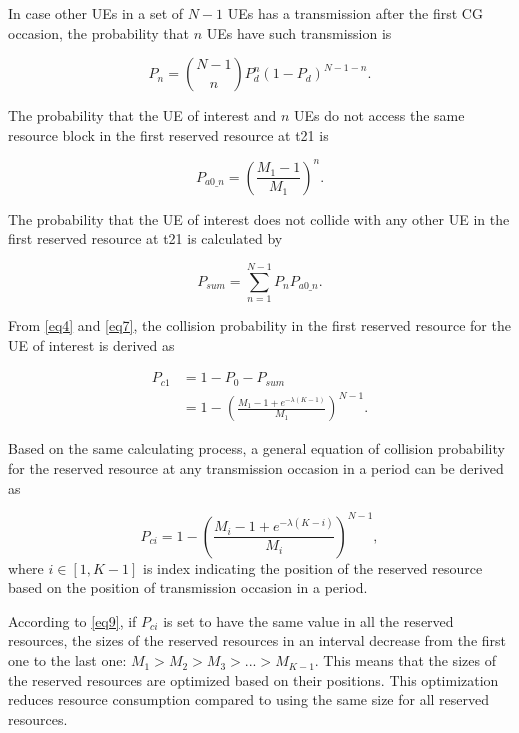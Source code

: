\documentclass{ieeeaccess}
\begin{document}
In case other UEs in a set of $N-1$ UEs has a transmission after the first CG occasion, the probability that $n$  UEs have such transmission is 

\begin{equation}
P_{n} = \binom {N-1}{n}P_{d}^{n}(1-P_{d})^{N-1-n}.\label{eq5}
\end{equation}

The probability that the UE of interest and $n$ UEs do not access the same resource block in the first reserved resource at t21 is 

\begin{equation}
P_{a0\_n} = \left(\frac {M_{1}-1}{M_{1}}\right)^{n}.\label{eq6}
\end{equation}

The probability that the UE of interest does not collide with any other UE in the first reserved resource at t21 is calculated by 

\begin{equation}
P_{sum} = \sum_{n=1}^{N-1} P_{n}P_{a0\_n}.\label{eq7}
\end{equation}

From \eqref{eq4} and \eqref{eq7}, the collision probability in the first reserved resource for the UE of interest is derived as 

\begin{align}
P_{c1} &= 1 - P_{0} - P_{sum} \nonumber\\
 &= 1 - \left(\frac{M_{1}-1+e^{-\lambda(K-1)}}{M_{1}}\right)^{N-1}.\label{eq8}
\end{align}

Based on the same calculating process, a general equation of collision probability for the reserved resource at any transmission occasion in a period can be derived as 

\begin{equation}
P_{ci} = 1 - \left(\frac{M_{i}-1+e^{-\lambda(K-i)}}{M_{i}}\right)^{N-1},\label{eq9}
\end{equation}
where
$i \in [1, K-1]$ is index indicating the position of the reserved resource based on the position of transmission occasion in a period.

According to \eqref{eq9}, if $P_{ci}$ is set to have the same value in all the reserved resources, the sizes of the reserved resources in an interval decrease from the first one to the last one: $M_1 > M_2 > M_3 > ... > M_{K-1}$. This means that the sizes of the reserved resources are optimized based on their positions. This optimization reduces resource consumption compared to using the same size for all reserved resources.
\end{document}
